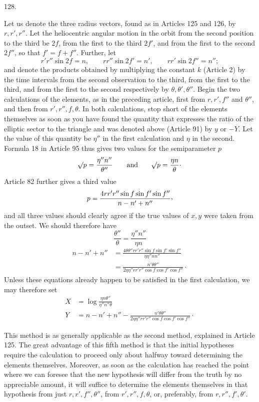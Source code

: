 \par{}\medskip
\begin{center}\hypertarget{native-174-article128}{}128.\end{center}
Let us denote the three radius vectors, found as in Articles 125 and 126, by $r,r',r''$. Let the
heliocentric angular motion in the orbit from the second position to the third be $2f$, from the
first to the third $2f'$, and from the first to the second $2f''$, so that $f'=f+f''$. Further, let
\[
r'r''\sin2f=n,\qquad rr''\sin2f'=n',\qquad rr'\sin2f''=n'';
\]
and denote the products obtained by multiplying the constant $k$ (Article 2) by the time intervals
from the second
observation to the third, from the first to the third, and from the first to the second respectively by $\theta,\theta',\theta''$. Begin the two calculations of the elements, as in the preceding article, first
from $r,r',f''$ and $\theta''$, and then from $r',r'',f,\theta$. In both calculations, stop short of the elements themselves
as soon as you have found the quantity that expresses the ratio of the elliptic sector to the
triangle and was denoted above (Article 91) by $y$ or $-Y$. Let the value of this quantity be $\eta''$
in the first calculation and $\eta$ in the second. Formula 18 in Article 95 thus gives two values for
the semiparameter $p$
\[
\mathord{{}^{}\!\surd}p=\frac{\eta''n''}{\theta''}\qquad\text{and}\qquad
\mathord{{}^{}\!\surd}p=\frac{\eta n}{\theta}\mathpunct{\cdot}
\]
Article 82 further gives a third value
\[
p=\frac{4rr'r''\sin f\sin f'\sin f''}{n-n'+n''}\mathpunct{\raisebox{.45ex}{,}}
\]
and all three values should clearly agree if the true values of $x,y$ were taken from the outset. We
should therefore have
\[
\frac{\theta''}{\theta}=\frac{\eta''n''}{\eta n}
\]
\[
\begin{aligned}
n-n'+n''&=\frac{4\theta\theta''rr'r''\sin f\sin f'\sin f''}{\eta\eta''nn''}\\[5pt]
&=\frac{n'\theta\theta''}{2\eta\eta''rr'r''\cos f\cos f'\cos f''}\mathpunct{\cdot}
\end{aligned}
\]
Unless these equations already happen to be satisfied in the first calculation, we may therefore set
\[
\begin{aligned}
X&=\log\frac{\eta n\theta''}{\eta''n''\theta}\\[5pt]
Y&=n-n'+n''-\frac{n'\theta\theta''}{2\eta\eta''rr'r''\cos f\cos f'\cos f''}\mathpunct{\cdot}
\end{aligned}
\]

This method is as generally applicable as the second method, explained in Article 125. The great
advantage of this fifth method is that the initial hypotheses require the calculation to proceed
only about halfway toward determining the elements themselves. Moreover, as soon as the calculation
has reached the point where we can foresee that the new hypothesis will differ from the truth by no
appreciable amount, it will suffice to determine the elements themselves in that hypothesis from
just $r,r',f'',\theta''$, from $r',r'',f,\theta$, or, preferably, from $r,r'',f',\theta'$.
